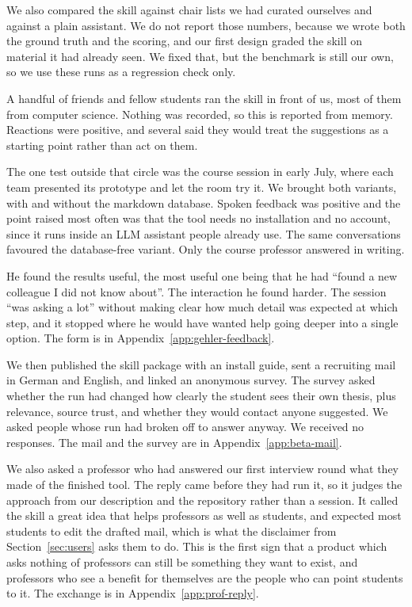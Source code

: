 \documentclass[11pt,a4paper]{article}
\begin{document}
\noindent We also compared the skill against chair lists we had curated
ourselves and against a plain assistant. We do not report those numbers, because
we wrote both the ground truth and the scoring, and our first design graded the
skill on material it had already seen. We fixed that, but the benchmark is still
our own, so we use these runs as a regression check only.

\noindent A handful of friends and fellow students ran the skill in front of
us, most of them from computer science. Nothing was recorded, so this is
reported from memory. Reactions were
positive, and several said they would treat the suggestions as a starting point
rather than act on them.

\noindent The one test outside that circle was the course session in early July,
where each team presented its prototype and let the room try it. We brought both
variants, with and without the markdown database. Spoken feedback was positive
and the point raised most often was that the tool needs no installation and no
account, since it runs inside an LLM assistant people already use. The same
conversations favoured the database-free variant. Only the course professor answered in writing.

\noindent He found the results useful, the most useful one being that he had
``found a new colleague I did not know about''. The interaction he found harder.
The session ``was asking a lot'' without making clear how much detail was
expected at which step, and it stopped where he would have wanted help going
deeper into a single option. The
form is in Appendix~\ref{app:gehler-feedback}.

\noindent We then published the skill package with an install guide, sent a
recruiting mail in German and English, and linked an anonymous survey. The survey
asked whether the run had changed how clearly the student sees their own thesis,
plus relevance, source trust, and whether they would contact anyone suggested. We
asked people whose run had broken off to answer anyway. We received no
responses. The mail and the survey are in
Appendix~\ref{app:beta-mail}.

\noindent We also asked a professor who had answered our first interview
round what they made of the finished tool. The reply
came before they had run it, so it judges the approach from our description and
the repository rather than a session. It called the skill a great idea that
helps professors as well as students, and expected most students to edit the
drafted mail, which is what the disclaimer from
Section~\ref{sec:users} asks them to do. 
This is the first sign that a product which asks nothing of professors can still be
something they want to exist, and professors who see a benefit for themselves
are the people who can point students to it. The exchange is in
Appendix~\ref{app:prof-reply}.
\end{document}
